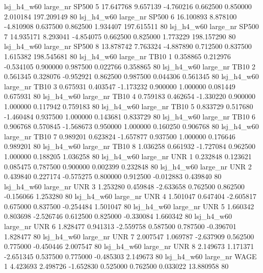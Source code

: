   lsj_h4_w60   large_nr    SP500                 5 17.647768  9.657139  -4.760216 0.662500 0.850000  2.010184  197.209149 80
  lsj_h4_w60   large_nr    SP500                 6 16.100893  8.878100  -4.810908 0.637500 0.862500  1.934407  197.615511 80
  lsj_h4_w60   large_nr    SP500                 7 14.935171  8.293041  -4.854075 0.662500 0.825000  1.773229  198.157290 80
  lsj_h4_w60   large_nr    SP500                 8 13.878742  7.763324  -4.887890 0.712500 0.837500  1.615382  198.545681 80
  lsj_h4_w60   large_nr     TB10                 1  0.358865  0.212976  -0.534105 0.900000 0.987500  0.022766    0.358865 80
  lsj_h4_w60   large_nr     TB10                 2  0.561345  0.328076  -0.952921 0.862500 0.987500  0.044306    0.561345 80
  lsj_h4_w60   large_nr     TB10                 3  0.675931  0.403547  -1.173232 0.900000 1.000000  0.081449    0.675931 80
  lsj_h4_w60   large_nr     TB10                 4  0.759183  0.462654  -1.330220 0.900000 1.000000  0.117942    0.759183 80
  lsj_h4_w60   large_nr     TB10                 5  0.833729  0.517680  -1.460484 0.937500 1.000000  0.143681    0.833729 80
  lsj_h4_w60   large_nr     TB10                 6  0.906768  0.570845  -1.568673 0.950000 1.000000  0.160250    0.906768 80
  lsj_h4_w60   large_nr     TB10                 7  0.989201  0.623824  -1.657877 0.937500 1.000000  0.176646    0.989201 80
  lsj_h4_w60   large_nr     TB10                 8  1.036258  0.661932  -1.727084 0.962500 1.000000  0.188205    1.036258 80
  lsj_h4_w60   large_nr      UNR                 1  0.232848  0.123621   0.085475 0.787500 0.900000  0.002399    0.232848 80
  lsj_h4_w60   large_nr      UNR                 2  0.439840  0.227174  -0.575275 0.800000 0.912500 -0.012883    0.439840 80
  lsj_h4_w60   large_nr      UNR                 3  1.253280  0.459848  -2.633658 0.762500 0.862500 -0.156066    1.253280 80
  lsj_h4_w60   large_nr      UNR                 4  1.501047  0.647404  -2.605817 0.675000 0.837500 -0.254484    1.501047 80
  lsj_h4_w60   large_nr      UNR                 5  1.660342  0.803698  -2.526746 0.612500 0.825000 -0.330084    1.660342 80
  lsj_h4_w60   large_nr      UNR                 6  1.828477  0.941313  -2.559758 0.587500 0.787500 -0.396701    1.828477 80
  lsj_h4_w60   large_nr      UNR                 7  2.007547  1.069787  -2.637909 0.562500 0.775000 -0.450446    2.007547 80
  lsj_h4_w60   large_nr      UNR                 8  2.149673  1.171371  -2.651345 0.537500 0.775000 -0.485303    2.149673 80
  lsj_h4_w60   large_nr     WAGE                 1  4.423693  2.498726  -1.652830 0.525000 0.762500  0.033022   13.880958 80
